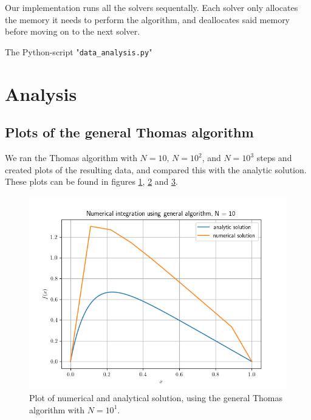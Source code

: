 \documentclass[english,notitlepage,reprint,nofootinbib]{revtex4-1}  %
\begin{document}
Our implementation runs all the solvers sequentally. Each solver only allocates the memory it needs to perform the algorithm, and deallocates said memory before moving on to the next solver.

The Python-script "\verb+data_analysis.py+"

\newpage

\section{Analysis} \label{sec:IV}
\subsection{Plots of the general Thomas algorithm} \label{subsec:IV:A}

We ran the Thomas algorithm with $N=10$, $N=10^2$, and $N=10^3$ steps and created plots of the resulting data, and compared this with the analytic solution. These plots can be found in figures \hyperref[fig:iv:a:1]{1}, \hyperref[fig:iv:a:2]{2} and \hyperref[fig:iv:a:3]{3}.


\begin{figure}[H]
	\centering
	\label{fig:iv:a:1}
	\includegraphics[width=\columnwidth]{plots/Figure_1.png}
	\caption{Plot of numerical and analytical solution, using the general Thomas algorithm with
	\(N=10^{1}\).}
\end{figure}
\end{document}
